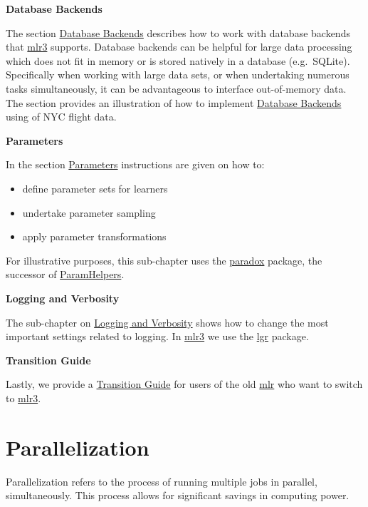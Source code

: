 \documentclass[]{scrbook}
\providecommand{\tightlist}{%
  \setlength{\itemsep}{0pt}\setlength{\parskip}{0pt}}
\begin{document}
\textbf{Database Backends}

The section \protect\hyperlink{backends}{Database Backends} describes how to work with database backends that \href{https://mlr3.mlr-org.com}{mlr3} supports.
Database backends can be helpful for large data processing which does not fit in memory or is stored natively in a database (e.g.~SQLite).
Specifically when working with large data sets, or when undertaking numerous tasks simultaneously, it can be advantageous to interface out-of-memory data.
The section provides an illustration of how to implement \protect\hyperlink{backends}{Database Backends} using of NYC flight data.

\textbf{Parameters}

In the section \protect\hyperlink{paradox}{Parameters} instructions are given on how to:

\begin{itemize}
\tightlist
\item
  define parameter sets for learners
\item
  undertake parameter sampling
\item
  apply parameter transformations
\end{itemize}

For illustrative purposes, this sub-chapter uses the \href{https://paradox.mlr-org.com}{paradox} package, the successor of \href{https://cran.r-project.org/package=ParamHelpers}{ParamHelpers}.

\textbf{Logging and Verbosity}

The sub-chapter on \protect\hyperlink{logging}{Logging and Verbosity} shows how to change the most important settings related to logging.
In \href{https://mlr3.mlr-org.com}{mlr3} we use the \href{https://cran.r-project.org/package=lgr}{lgr} package.

\textbf{Transition Guide}

Lastly, we provide a \protect\hyperlink{transition}{Transition Guide} for users of the old \href{https://mlr.mlr-org.com}{mlr} who want to switch to \href{https://mlr3.mlr-org.com}{mlr3}.

\hypertarget{parallelization}{%
\section{Parallelization}\label{parallelization}}

Parallelization refers to the process of running multiple jobs in parallel, simultaneously.
This process allows for significant savings in computing power.
\end{document}
